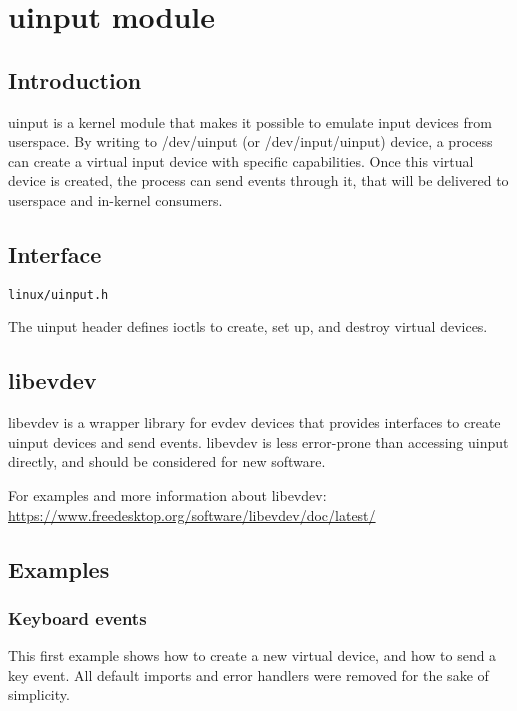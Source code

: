 \documentclass[a4paper,8pt,english]{sphinxmanual}
\begin{document}
\section{uinput module}
\label{input/uinput::doc}\label{input/uinput:uinput-module}

\subsection{Introduction}
\label{input/uinput:introduction}
uinput is a kernel module that makes it possible to emulate input devices
from userspace. By writing to /dev/uinput (or /dev/input/uinput) device, a
process can create a virtual input device with specific capabilities. Once
this virtual device is created, the process can send events through it,
that will be delivered to userspace and in-kernel consumers.


\subsection{Interface}
\label{input/uinput:interface}
\begin{Verbatim}[commandchars=\\\{\}]
linux/uinput.h
\end{Verbatim}

The uinput header defines ioctls to create, set up, and destroy virtual
devices.


\subsection{libevdev}
\label{input/uinput:libevdev}
libevdev is a wrapper library for evdev devices that provides interfaces to
create uinput devices and send events. libevdev is less error-prone than
accessing uinput directly, and should be considered for new software.

For examples and more information about libevdev:
\href{https://www.freedesktop.org/software/libevdev/doc/latest/}{https://www.freedesktop.org/software/libevdev/doc/latest/}


\subsection{Examples}
\label{input/uinput:examples}

\subsubsection{Keyboard events}
\label{input/uinput:keyboard-events}
This first example shows how to create a new virtual device, and how to
send a key event. All default imports and error handlers were removed for
the sake of simplicity.
\end{document}
